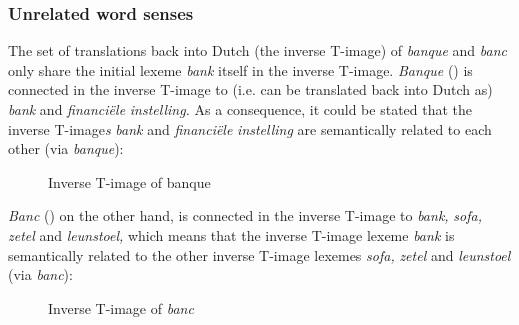 \subsubsection{Unrelated word senses}
\label{sec:3.4.3.1}
The set of translations back into Dutch (the inverse T-image) of \textit{banque} and \textit{banc} only share the initial lexeme \textit{bank} itself in the inverse T-image. \textit{Banque} () is connected in the inverse T-image to (i.e. can be translated back into Dutch as) \textit{bank} and \textit{financiële} \textit{instelling.} As a consequence, it could be stated that the inverse T-image\textit{s} \textit{bank} and \textit{financiële} \textit{instelling} are semantically related to each other (via \textit{banque}):

\begin{figure}
\caption{\label{fig:3:10}{Inverse} {T-image} {of} {banque}}
\end{figure}

\textit{Banc} () on the other hand, is connected in the inverse T-image to \textit{bank,} \textit{sofa,} \textit{zetel} and \textit{leunstoel,} which means that the inverse T-image lexeme \textit{bank} is semantically related to the other inverse T-image lexemes \textit{sofa,} \textit{zetel} and \textit{leunstoel} (via \textit{banc}):

\begin{figure}
\caption{\label{fig:3:11}Inverse T-image of \textit{banc}}
\end{figure}


